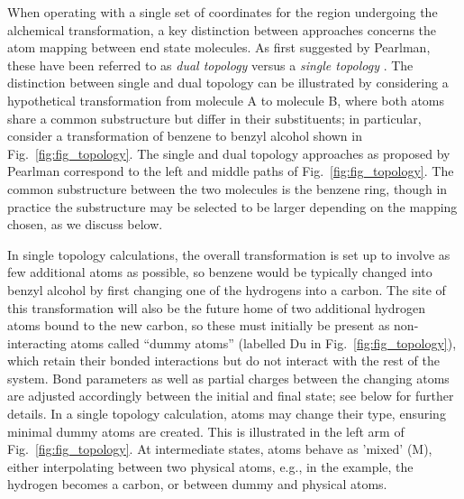 \documentclass[9pt,bestpractices,pubversion]{livecoms}
\newcommand{\sbnote}[1]{%
  {\bfseries{}[SB: }%
  {\textcolor{blue}{#1}}{\bfseries{}]}
  }
\begin{document}
When operating with a single set of coordinates for the region undergoing the alchemical transformation, a key distinction between approaches concerns the atom mapping between end state molecules. %
As first suggested by Pearlman, these have been referred to as \emph{dual topology} versus a \emph{single topology} \cite{Pearlman_1994}. The distinction between single and dual topology can be illustrated by considering a hypothetical transformation from molecule A to molecule B, where both atoms share a common substructure but differ in their substituents; in particular, consider a transformation of benzene to benzyl alcohol shown in Fig.~\ref{fig:fig_topology}. The single and dual topology approaches as proposed by Pearlman correspond to the left and middle paths of Fig.~\ref{fig:fig_topology}.  %
The common substructure between the two molecules is the benzene ring, though in practice the substructure may be selected to be larger depending on the mapping chosen, as we discuss below.

In single topology calculations, the overall transformation is set up to involve as few additional atoms as possible, so benzene would be typically changed into benzyl alcohol by first changing one of the hydrogens into a carbon. The site of this transformation will also be the future home of two additional hydrogen atoms bound to the new carbon, so these must initially be present as non-interacting atoms called ``dummy atoms'' (labelled Du in Fig.~\ref{fig:fig_topology}), which retain their bonded interactions but do not interact with the rest of the system.  Bond parameters as well as partial charges between the changing atoms are adjusted accordingly between the initial and final state; see below for further details. In a single topology calculation, atoms may change their type, ensuring minimal dummy atoms are created. This is illustrated in the left arm of Fig.~\ref{fig:fig_topology}. At intermediate states, atoms behave as 'mixed' (M), either interpolating between two physical atoms, e.g., in the example, the hydrogen becomes a carbon, or between dummy and physical atoms.
\end{document}
